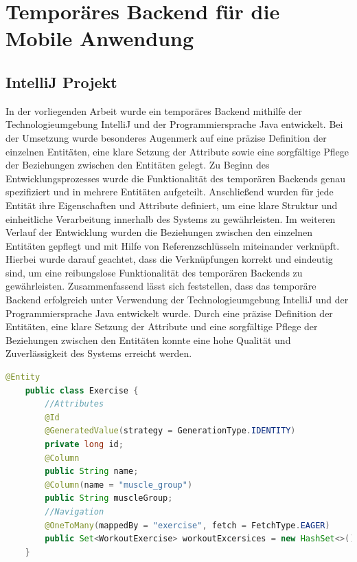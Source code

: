 \section{Temporäres Backend für die Mobile Anwendung}

\subsection{IntelliJ Projekt}
In der vorliegenden Arbeit wurde ein temporäres Backend mithilfe der Technologieumgebung IntelliJ und der Programmiersprache Java entwickelt. Bei der Umsetzung wurde besonderes Augenmerk auf eine präzise Definition der einzelnen Entitäten, eine klare Setzung der Attribute sowie eine sorgfältige Pflege der Beziehungen zwischen den Entitäten gelegt.
\newline
\newline
Zu Beginn des Entwicklungsprozesses wurde die Funktionalität des temporären Backends genau spezifiziert und in mehrere Entitäten aufgeteilt. Anschließend wurden für jede Entität ihre Eigenschaften und Attribute definiert, um eine klare Struktur und einheitliche Verarbeitung innerhalb des Systems zu gewährleisten.
\newline
\newline
Im weiteren Verlauf der Entwicklung wurden die Beziehungen zwischen den einzelnen Entitäten gepflegt und mit Hilfe von Referenzschlüsseln miteinander verknüpft. Hierbei wurde darauf geachtet, dass die Verknüpfungen korrekt und eindeutig sind, um eine reibungslose Funktionalität des temporären Backends zu gewährleisten.
\newline
\newline
Zusammenfassend lässt sich feststellen, dass das temporäre Backend erfolgreich unter Verwendung der Technologieumgebung IntelliJ und der Programmiersprache Java entwickelt wurde. Durch eine präzise Definition der Entitäten, eine klare Setzung der Attribute und eine sorgfältige Pflege der Beziehungen zwischen den Entitäten konnte eine hohe Qualität und Zuverlässigkeit des Systems erreicht werden.
\newpage
\begin{lstlisting}[language=Java,caption=Entity | Person,label=lst:impl:foo]
    @Entity
    public class Exercise {
        //Attributes
        @Id
        @GeneratedValue(strategy = GenerationType.IDENTITY)
        private long id;
        @Column
        public String name;
        @Column(name = "muscle_group")
        public String muscleGroup;
        //Navigation
        @OneToMany(mappedBy = "exercise", fetch = FetchType.EAGER)
        public Set<WorkoutExercise> workoutExcersices = new HashSet<>();
    }
\end{lstlisting}

